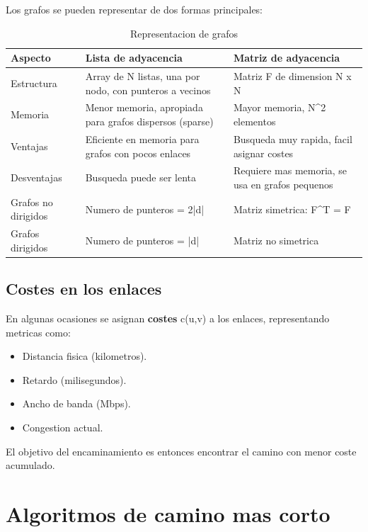 Los grafos se pueden representar de dos formas principales:

\begin{table}[htbp]
\centering
\small
\caption{Representacion de grafos}
\begin{tabularx}{\textwidth}{@{}l>{\raggedright\arraybackslash}X>{\raggedright\arraybackslash}X@{}}
\toprule
\textbf{Aspecto} & \textbf{Lista de adyacencia} & \textbf{Matriz de adyacencia} \\
\midrule
Estructura & Array de N listas, una por nodo, con punteros a vecinos & Matriz F de dimension N x N \\
Memoria & Menor memoria, apropiada para grafos dispersos (sparse) & Mayor memoria, N\^{}2 elementos \\
Ventajas & Eficiente en memoria para grafos con pocos enlaces & Busqueda muy rapida, facil asignar costes \\
Desventajas & Busqueda puede ser lenta & Requiere mas memoria, se usa en grafos pequenos \\
Grafos no dirigidos & Numero de punteros = 2|d| & Matriz simetrica: F\^{}T = F \\
Grafos dirigidos & Numero de punteros = |d| & Matriz no simetrica \\
\bottomrule
\end{tabularx}
\end{table}

\subsection{Costes en los enlaces}

En algunas ocasiones se asignan \textbf{costes} c(u,v) a los enlaces, representando
metricas como:
\begin{itemize}
    \item Distancia fisica (kilometros).
    \item Retardo (milisegundos).
    \item Ancho de banda (Mbps).
    \item Congestion actual.
\end{itemize}

El objetivo del encaminamiento es entonces encontrar el camino con menor coste
acumulado.


\section{Algoritmos de camino mas corto}

